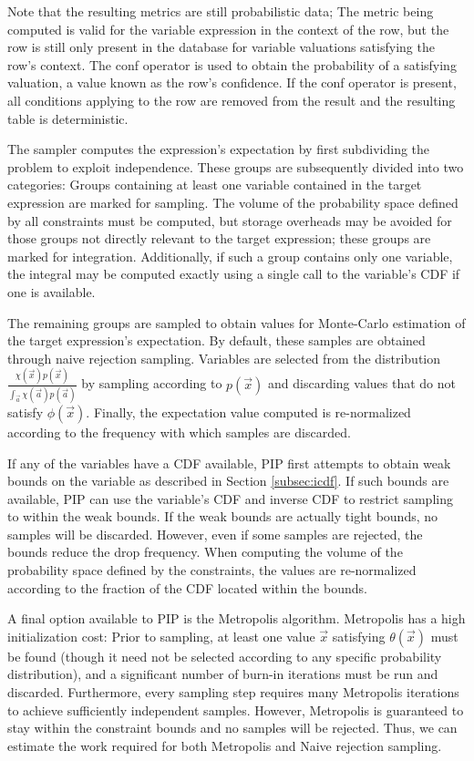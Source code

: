 Note that the resulting metrics are still probabilistic data; The metric being computed is valid for the variable expression in the context of the row, but the row is still only present in the database for variable valuations satisfying the row's context.  The conf operator is used to obtain the probability of a satisfying valuation, a value known as the row's confidence.  If the conf operator is present, all conditions applying to the row are removed from the result and the resulting table is deterministic.


The sampler computes the expression's expectation by first subdividing the problem to exploit independence.  These groups are subsequently divided into two categories: Groups containing at least one variable contained in the target expression are marked for sampling.  The volume of the probability space defined by all constraints must be computed, but storage overheads may be avoided for those groups not directly relevant to the target expression; these groups are marked for integration.  Additionally, if such a group contains only one variable, the integral may be computed exactly using a single call to the variable's CDF if one is available.

The remaining groups are sampled to obtain values for Monte-Carlo estimation of the target expression's expectation.  By default, these samples are obtained through naive rejection sampling.  Variables are selected from the distribution $\frac{\chi(\vec{x})p(\vec{x})}{\int_{\vec{a}} \chi(\vec{a})p(\vec{a})}$ by sampling according to $p(\vec{x})$ and discarding values that do not satisfy $\phi(\vec{x})$.  Finally, the expectation value computed is re-normalized according to the frequency with which samples are discarded.

If any of the variables have a CDF available, PIP first attempts to obtain weak bounds on the variable as described in Section \ref{subsec:icdf}.  If such bounds are available, PIP can use the variable's CDF and inverse CDF to restrict sampling to within the weak bounds.  If the weak bounds are actually tight bounds, no samples will be discarded.  However, even if some samples are rejected, the bounds reduce the drop frequency.  When computing the volume of the probability space defined by the constraints, the values are re-normalized according to the fraction of the CDF located within the bounds.

A final option available to PIP is the Metropolis algorithm.  Metropolis has a high initialization cost: Prior to sampling, at least one value $\vec x$ satisfying $\theta(\vec x)$ must be found (though it need not be selected according to any specific probability distribution), and a significant number of burn-in iterations must be run and discarded.  Furthermore, every sampling step requires many Metropolis iterations to achieve sufficiently independent samples.  However, Metropolis is guaranteed to stay within the constraint bounds and no samples will be rejected.  Thus, we can estimate the work required for both Metropolis and Naive rejection sampling.

